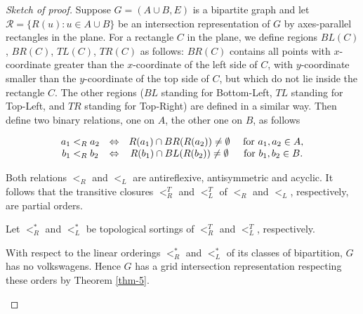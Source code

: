 \begin{proof}[Sketch of proof]
	Suppose $G = (A \cup B, E)$ is a bipartite graph and let $\mathcal{R} = \{R(u) : u \in A \cup B\}$ be an intersection representation of $G$ by axes-parallel rectangles in the plane. For a rectangle $C$ in the plane, we define regions $BL(C)$, $BR(C)$, $TL(C)$, $TR(C)$ as follows: $BR(C)$ contains all points with $x$-coordinate greater than the $x$-coordinate of the left side of $C$, with $y$-coordinate smaller than the $y$-coordinate of the top side of $C$, but which do not lie inside the rectangle $C$. The other regions ($BL$ standing for Bottom-Left, $TL$ standing for Top-Left, and $TR$ standing for Top-Right) are defined in a similar way. Then define two binary relations, one on $A$, the other one on $B$, as follows
	
	$$
	\begin{array}{c c c c}
		a_1 <_R a_2 & \Leftrightarrow & R(a_1) \cap BR(R(a_2)) \neq \emptyset & \text{ for } a_1, a_2 \in A, \\
		b_1 <_R b_2 & \Leftrightarrow & R(b_1) \cap BL(R(b_2)) \neq \emptyset & \text{ for } b_1, b_2 \in B. \\
	\end{array}
	$$
	
	\begin{claim}
		Both relations $<_R$ and $<_L$ are antireflexive, antisymmetric and acyclic. It follows that the transitive closures $<_{R}^T$ and $<_{L}^T$ of $<_R$ and $<_L$, respectively, are partial orders.
	\end{claim}
	
	Let $<_R^\ast$ and $<_L^\ast$ be topological sortings of $<_R^T$ and $<_L^T$, respectively.
	
	\begin{claim}
		With respect to the linear orderings $<_R^\ast$ and $<_L^\ast$ of its classes of bipartition, $G$ has no volkswagens. Hence $G$ has a grid intersection representation respecting these orders by Theorem \ref{thm-5}.
	\end{claim}
\end{proof}